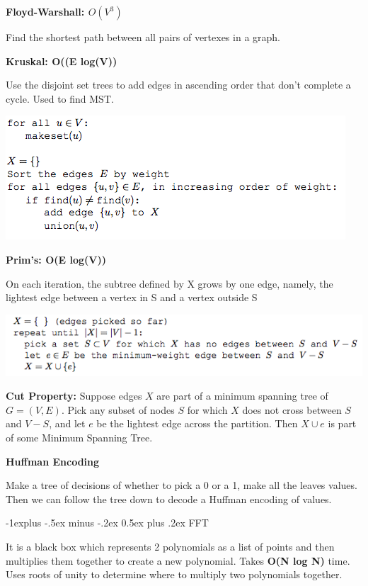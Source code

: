 \documentclass[landscape]{article}
\makeatletter
\renewcommand{\subsection}{\@startsection{subsection}{2}{0mm}%
                            {-1explus -.5ex minus -.2ex}%
                            {0.5ex plus .2ex}%
                            {\normalfont\normalsize\bfseries}}
\makeatother
\begin{document}
\begin{multicols}{3}
\textbf{Floyd-Warshall: $O(V^3)$}

Find the shortest path between all pairs of vertexes in a graph.

\textbf{Kruskal: O((E log(V))}

Use the disjoint set trees to add edges in ascending order that don't complete a cycle. Used to find MST.

\includegraphics[scale=0.5]{kruskal}

\textbf{Prim's: O(E log(V))}

On each iteration, the subtree defined by X grows by one edge, namely, the lightest edge
between a vertex in S and a vertex outside S

\includegraphics[scale=0.42]{prim}

\textbf{Cut Property:}
Suppose edges $X$ are part of a minimum spanning tree of
$G = (V, E)$. Pick any subset of nodes $S$ for which $X$ does not
cross between $S$ and $V-S$, and let $e$ be the lightest edge across the
partition. Then $X \cup e$ is part of some Minimum Spanning Tree.



\textbf{Huffman Encoding}

Make a tree of decisions of whether to pick a 0 or a 1, make all the leaves values.
Then we can follow the tree down to decode a Huffman encoding of values.

\subsection{FFT}

It is a black box which represents 2 polynomials as a list of points and then multiplies them together to create a new polynomial. Takes \textbf{O(N log N)} time. Uses roots of unity to determine where to multiply two polynomials together.


\end{multicols}
\end{document}
